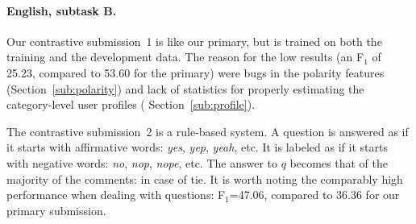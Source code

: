 \paragraph{English, subtask B.}

Our contrastive submission~1 is like our primary,
but is trained on both the training and the development data.
The reason for the low results (an F$_1$ of 25.23, compared to 53.60 for the primary)
were bugs in the polarity features (\cf Section~\ref{sub:polarity})
and lack of statistics for properly estimating the category-level user profiles (\cf 
Section~\ref{sub:profile}). 

The contrastive submission~2 is a rule-based system. A question is answered
as \yes if it starts with affirmative words: \textit{yes}, 
\textit{yep}, \textit{yeah}, etc. It is labeled as \no if it starts with 
negative words: \textit{no}, \textit{nop}, \textit{nope}, etc. The answer to $q$ 
becomes that of the majority of the comments: \unsure in case of tie. It is 
worth noting the comparably high performance when dealing with \unsure questions: 
F$_1$=47.06, compared to 36.36 for our primary submission.